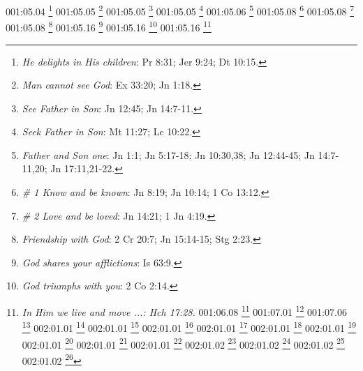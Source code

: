 {{{{{{{001:05.04 \footnote{\textit{He delights in His children}: Pr 8:31; Jer 9:24; Dt 10:15.}
001:05.05 \footnote{\textit{Man cannot see God}: Ex 33:20; Jn 1:18.}
001:05.05 \footnote{\textit{See Father in Son}: Jn 12:45; Jn 14:7-11.}
001:05.05 \footnote{\textit{Seek Father in Son}: Mt 11:27; Lc 10:22.}
001:05.06 \footnote{\textit{Father and Son one}: Jn 1:1; Jn 5:17-18; Jn 10:30,38; Jn 12:44-45; Jn 14:7-11,20; Jn 17:11,21-22.}
001:05.08 \footnote{\textit{# 1 Know and be known}: Jn 8:19; Jn 10:14; 1 Co 13:12.}
001:05.08 \footnote{\textit{# 2 Love and be loved}: Jn 14:21; 1 Jn 4:19.}
001:05.08 \footnote{\textit{Friendship with God}: 2 Cr 20:7; Jn 15:14-15; Stg 2:23.}
001:05.16 \footnote{\textit{God shares your afflictions}: Is 63:9.}
001:05.16 \footnote{\textit{God triumphs with you}: 2 Co 2:14.}
001:05.16 \footnote{\textit{In Him we live and move ...: Hch 17:28.}
001:06.08 \footnote{\textit{God is a spirit}: Jn 4:24.}
001:07.01 \footnote{\textit{The living God}: Mt 16:16-17; Jn 6:57,69.}
001:07.06 \footnote{\textit{The Lord God is one}: 2 Re 19:19; 1 Cr 17:20; Neh 9:6; Sal 86:10; Eclo 36:5; Is 37:16; Is 44:6,8; Is 45:5-6.21; Dt 4:35,39; Dt 6:4; Mc 12:29,32; Jn 17:3; Ro 3:30; 1 Co 8:4-6; Gl 3:20; Ef 4:6; 1 Ti 2:5; Stg 2:19; 1 Sam 2:2; 2 Sam 7:22.}
002:01.01 \footnote{\textit{God dwells in thick darkness}: Ex 20:21; 1 Re 8:12; 2 Cr 6:1; Dt 4:11; Dt 5:22-23.}
002:01.01 \footnote{\textit{God is great}: Job 36:26.}
002:01.01 \footnote{\textit{Heaven of heavens}: 1 Re 8:27; 2 Cr 2:6; 2 Cr 6:18; Neh 9:6; Sal 148:4; Dt 10:14.}
002:01.01 \footnote{\textit{Marvels without number}: Job 5:9; Job 9:10.}
002:01.01 \footnote{\textit{Pt 1: Touching the infinite}: Job 37:23.}
002:01.01 \footnote{\textit{Pt 1: Understanding is infinite}: Job 12:13; Sal 147:5.}
002:01.01 \footnote{\textit{Pt 2: Divine footsteps}: Sal 77:19.}
002:01.01 \footnote{\textit{Pt 2: Greatness unsearchable}: Sal 145:3.}
002:01.01 \footnote{\textit{Unsearchable judgments}: Ro 11:33.}
002:01.02 \footnote{\textit{Faithful and Divine Creator}: Gn 1:1-27; Gn 2:4-23; Gn 5:1-2; Ex 20:11; Ex 31:17; 2 Re 19:15; 2 Cr 2:12; Neh 9:6; Sal 115:15; Sal 121:2; Sal 124:8; Sal 134:3; Sal 146:6; Eclo 1:1-4; Eclo 33:10; Is 37:16; Is 40:26,28; Is 42:5; Is 45:12,18; Jer 10:11-12; Jer 32:17; Jer 51:15; Bar 3:32-36; Am 4:13; Mal 2:10; Mc 13:19; Jn 1:1-3; Hch 4:24; Hch 14:15; Ef 3:9; Col 1:16; Heb 1:2; 1 P 4:19; Ap 4:11; Ap 10:6; Ap 14:7.}
002:01.02 \footnote{\textit{Father of good purpose}: Stg 1:17.}
002:01.02 \footnote{\textit{Glory of God}: Is 35:2; Is 42:8.}
002:01.02 \footnote{\textit{God as Disposer}: Job 34:13; Pr 16:33.}
}}}}}}}}
